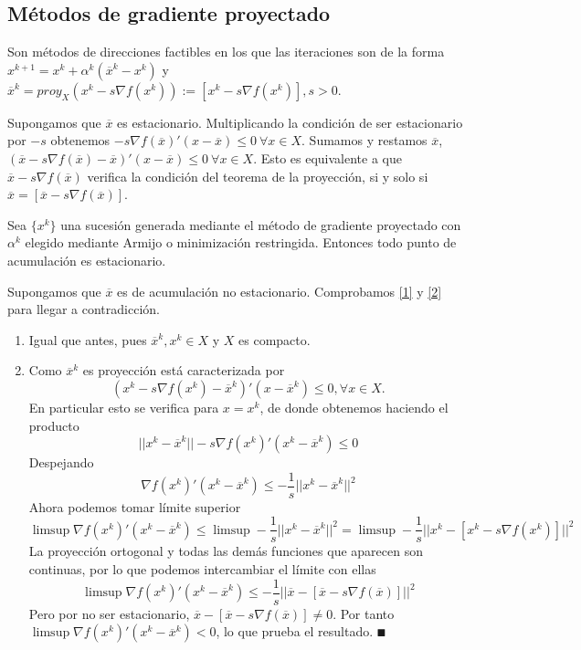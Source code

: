 \documentclass[MIOP.tex]{subfiles}
\begin{document}
\subsection{Métodos de gradiente proyectado}
Son métodos de direcciones factibles en los que las iteraciones son de la forma $x^{k+1}=x^k+\alpha^k(\overline{x}^k-x^k)$ y $\overline{x}^k=proy_X(x^k-s\nabla f(x^k)):=[x^k-s\nabla f(x^k)], s>0$. 

Supongamos que $\overline{x}$ es estacionario. Multiplicando la condición de ser estacionario por $-s$ obtenemos $-s\nabla f(\overline{x})'(x-\overline{x})\leq 0\ \forall x\in X$. Sumamos y restamos $\overline{x}$, $(\overline{x}-s\nabla f(\overline{x})-\overline{x})'(x-\overline{x})\leq 0\ \forall x\in X$. Esto es equivalente a que $\overline{x}-s\nabla f(\overline{x})$ verifica la condición del teorema de la proyección, si y solo si $\overline{x}=[\overline{x}-s\nabla f(\overline{x})]$. 

\begin{teorema}
Sea $\{x^k\}$ una sucesión generada mediante el método de gradiente proyectado con $\alpha^k$ elegido mediante Armijo o minimización restringida. Entonces todo punto de acumulación es estacionario.
\end{teorema}
\begin{dem}
Supongamos que $\overline{x}$ es de acumulación no estacionario. Comprobamos \ref{1} y \ref{2} para llegar a contradicción.
\begin{enumerate}
\item Igual que antes, pues $\overline{x}^k, x^k\in X$ y $X$ es compacto.
\item Como $\overline{x}^k$ es proyección está caracterizada por 
$$(x^k-s\nabla f(x^k)-\overline{x}^k)'(x-\overline{x}^k)\leq 0, \forall x\in X.$$
En particular esto se verifica para $x=x^k$, de donde obtenemos haciendo el producto
$$||x^k-\overline{x}^k||-s\nabla f(x^k)'(x^k-\overline{x}^k)\leq 0$$
Despejando
$$\nabla f(x^k)'(x^k-\overline{x}^k)\leq -\frac{1}{s}||x^k-\overline{x}^k||^2$$
Ahora podemos tomar límite superior
$$\limsup \nabla f(x^k)'(x^k-\overline{x}^k)\leq \limsup-\frac{1}{s}||x^k-\overline{x}^k||^2=\limsup-\frac{1}{s}||x^k-[x^k-s\nabla f(x^k)]||^2$$
La proyección ortogonal y todas las demás funciones que aparecen son continuas, por lo que podemos intercambiar el límite con ellas
$$\limsup \nabla f(x^k)'(x^k-\overline{x}^k)\leq -\frac{1}{s}||\overline{x}-[\overline{x}-s\nabla f(\overline{x})]||^2$$
Pero por no ser estacionario, $\overline{x}-[\overline{x}-s\nabla f(\overline{x})]\neq 0$. Por tanto $\limsup \nabla f(x^k)'(x^k-\overline{x}^k)<0$, lo que prueba el resultado. $\QED$
\end{enumerate}
\end{dem}
\end{document}
